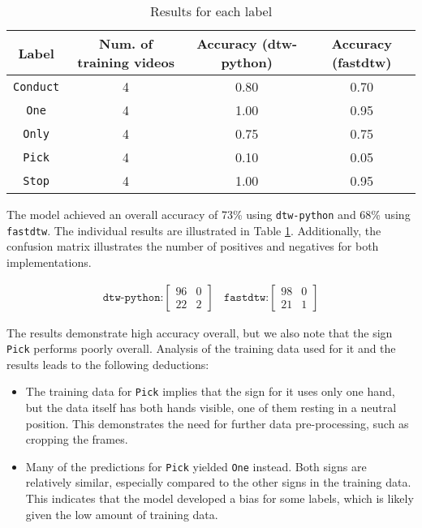 \documentclass[final,rdr32.tex]{subfiles}
\begin{document}
\begin{table}[H]
    \begin{center}
        \begin{tabular}{ |c|c|c|c| }
            \hline
            Label          & Num. of training videos & Accuracy (dtw-python) & Accuracy (fastdtw) \\
            \hline
            \verb|Conduct| & 4                       & 0.80                  & 0.70               \\
            \verb|One|     & 4                       & 1.00                  & 0.95               \\
            \verb|Only|    & 4                       & 0.75                  & 0.75               \\
            \verb|Pick|    & 4                       & 0.10                  & 0.05               \\
            \verb|Stop|    & 4                       & 1.00                  & 0.95               \\
            \hline
        \end{tabular}
    \end{center}
    \caption{Results for each label}
    \label{tab:bsldictresults}
\end{table}

The model achieved an overall accuracy of 73\% using \verb|dtw-python| and 68\% using \verb|fastdtw|. The individual results are illustrated in Table \ref{tab:bsldictresults}. Additionally, the confusion matrix illustrates the number of positives and negatives for both implementations.

\[\begin{aligned}
        \texttt{dtw-python:}
        \begin{bmatrix}
            96 & 0 \\
            22 & 2
        \end{bmatrix}\
        \text{ }
        \texttt{fastdtw:}
        \begin{bmatrix}
            98 & 0 \\
            21 & 1
        \end{bmatrix}
    \end{aligned}\]

The results demonstrate high accuracy overall, but we also note that the sign \verb|Pick| performs poorly overall. Analysis of the training data used for it and the results leads to the following deductions:
\begin{itemize}
    \item The training data for \verb|Pick| implies that the sign for it uses only one hand, but the data itself has both hands visible, one of them resting in a neutral position. This demonstrates the need for further data pre-processing, such as cropping the frames.
    \item Many of the predictions for \verb|Pick| yielded \verb|One| instead. Both signs are relatively similar, especially compared to the other signs in the training data. This indicates that the model developed a bias for some labels, which is likely given the low amount of training data.
\end{itemize}
\end{document}
